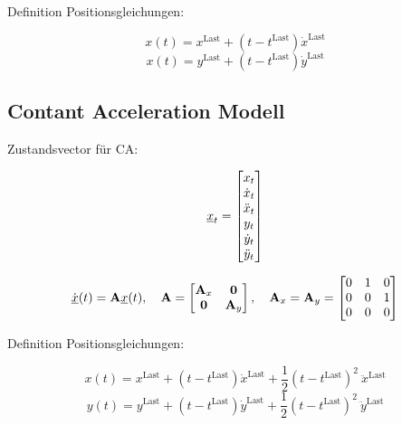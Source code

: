 Definition Positionsgleichungen:

\begin{equation*}
    x(t) = x^{\text{Last}} + (t - t^{\text{Last}})\dot{x}^{\text{Last}}
\end{equation*}
\begin{equation*}
    x(t) = y^{\text{Last}} + (t - t^{\text{Last}})\dot{y}^{\text{Last}}
\end{equation*}



\subsection{Contant Acceleration Modell}

Zustandsvector für CA:

\begin{equation*} \label{eq:definitionCA}
    {\underline{x}}_t = 
    \begin{bmatrix}
        x_t \\
        \dot{x}_t \\
        \ddot{x}_t \\
        y_t \\
        \dot{y}_t \\
        \ddot{y}_t
       \end{bmatrix} 
\end{equation*}


\begin{align*} \label{eq:speedCV}
    \dot{{\underline{x}}}(t) = {{\mathbf{A}}}{\underline{x}}(t), \quad {\ensuremath{{\mathbf{A}}}} = 
    \begin{bmatrix}
        {\ensuremath{{\mathbf{A}}}}_x & \boldsymbol{0} \\
        \boldsymbol{0} & {{\mathbf{A}}}_y
    \end{bmatrix} 
    , \quad
    {\ensuremath{{\mathbf{A}}}}_x = {{\mathbf{A}}}_y = 
    \begin{bmatrix}
        0 & 1 & 0 \\
        0 & 0 & 1 \\
        0 & 0 & 0
    \end{bmatrix} 
\end{align*}

Definition Positionsgleichungen:

\begin{equation*}
    x(t) = x^{\text{Last}} + (t - t^{\text{Last}})\dot{x}^{\text{Last}} 
    + \frac{1}{2} (t - t^{\text{Last}})^2 \: \ddot{x}^{\text{Last}}
\end{equation*}
\begin{equation*}
    y(t) = y^{\text{Last}} + (t - t^{\text{Last}})\dot{y}^{\text{Last}}
    + \frac{1}{2} (t - t^{\text{Last}})^2 \: \ddot{y}^{\text{Last}}
\end{equation*}

